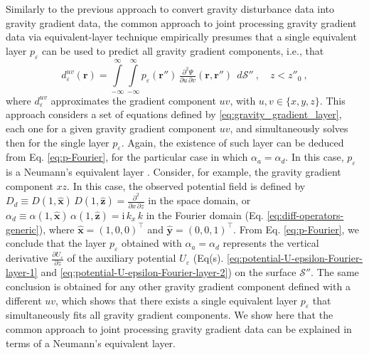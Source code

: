 Similarly to the previous approach to convert gravity disturbance data into gravity gradient 
data, the common approach to joint processing gravity gradient data 
\citep[e.g.,][]{boggs-dransfield2004,barnes_lumley2011, martinez_li_2016} via equivalent-layer 
technique empirically presumes that a single equivalent layer $p_{\varepsilon}$ can be used to 
predict all gravity gradient components, i.e., that
\begin{equation}
	d^{uv}_{\varepsilon}(\mathbf{r}) = 
	\int\limits_{-\infty}^{\infty}\int\limits_{-\infty}^{\infty}
	p_{\varepsilon}(\mathbf{r}'') \, 
	\tfrac{\partial^{2} \Psi}{\partial u \, \partial v}(\mathbf{r}, \mathbf{r}'') \:\: 
	d\mathcal{S}'' \: , \quad z < z''_{0} \: ,
	\label{eq:gravity_gradient_layer}
\end{equation}
where $d^{uv}_{\varepsilon}$ approximates the gradient component $uv$, with 
$u, v \in \{x, y, z\}$.
This approach considers a set of equations defined by \ref{eq:gravity_gradient_layer}, each one
for a given gravity gradient component $uv$, and simultaneously solves then for the single 
layer $p_{\varepsilon}$.
Again, the existence of such layer can be deduced from Eq. \ref{eq:p-Fourier}, for the 
particular case in which 
$\alpha_{a} = \alpha_{d}$. In this case, $p_{\varepsilon}$ is a Neumann's equivalent layer 
\cite{oliveirajr_etal2026_1}.
Consider, for example, the gravity gradient component $xz$. In this case, 
the observed potential field is defined by 
$D_{d} \equiv D(1, \hat{\mathbf{x}}) \, D(1, \hat{\mathbf{z}}) = \tfrac{\partial^{2}}{\partial x \, \partial z}$ in the
space domain, or 
$\alpha_{d} \equiv \alpha(1, \hat{\mathbf{x}}) \, \alpha(1, \hat{\mathbf{z}}) = \mathrm{i} \, k_{x} \, k$
in the Fourier domain (Eq. \ref{eq:diff-operators-generic}), where 
$\hat{\mathbf{x}} = (1, 0, 0)^{\top}$ and
$\hat{\mathbf{y}} = (0, 0, 1)^{\top}$.
From Eq. \ref{eq:p-Fourier}, we conclude that the layer $p_{\varepsilon}$ obtained with 
$\alpha_{a} = \alpha_{d}$ represents the vertical derivative 
$\tfrac{\partial U_{\varepsilon}}{\partial z}$ of the auxiliary potential 
$U_{\varepsilon}$ (Eq(s). \ref{eq:potential-U-epsilon-Fourier-layer-1} and 
\ref{eq:potential-U-epsilon-Fourier-layer-2}) 
on the surface $\mathcal{S}''$.
The same conclusion is obtained for any other gravity gradient component defined with a 
different $uv$, which shows that there exists a single equivalent layer $p_{\varepsilon}$ that 
simultaneously fits all gravity gradient components.
We show here that the common approach to joint processing gravity gradient data 
\citep[e.g.,][]{boggs-dransfield2004,barnes_lumley2011, martinez_li_2016} can be explained in 
terms of a Neumann's equivalent layer.

